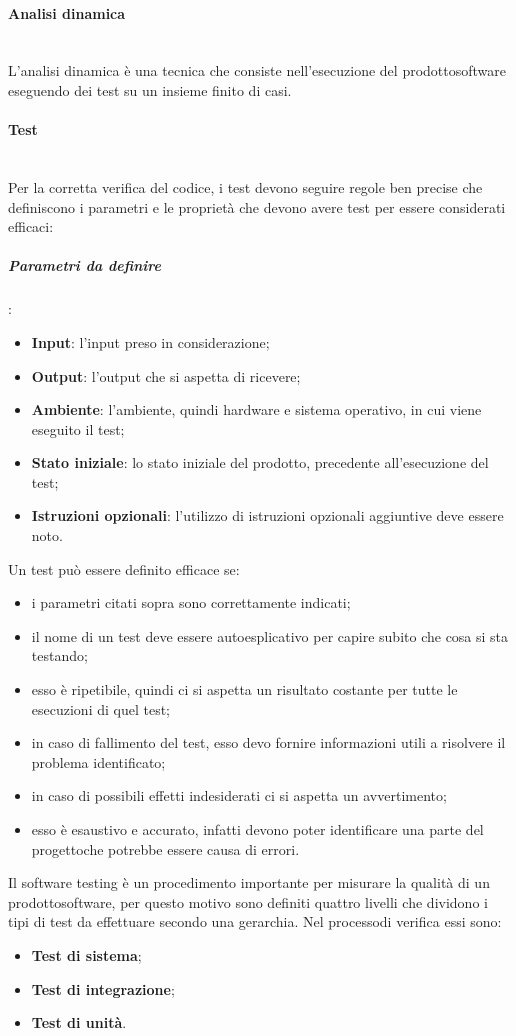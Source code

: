 \paragraph{Analisi dinamica} \mbox{}\\ [1mm]
L'analisi dinamica è una tecnica che consiste nell'esecuzione del prodotto\glosp software eseguendo dei test su un insieme finito di casi.
\paragraph*{Test}\mbox{}\\ [1mm]
Per la corretta verifica del codice, i test devono seguire regole ben precise che definiscono i parametri e le proprietà che devono avere test per essere considerati efficaci: \mbox{}\\ [1mm]
\subparagraph*{Parametri da definire}:
\begin{itemize}
	\item \textbf{Input}: l'input preso in considerazione;
	\item \textbf{Output}: l'output che si aspetta di ricevere;
	\item \textbf{Ambiente}: l'ambiente, quindi hardware e sistema operativo, in cui viene eseguito il test;
	\item \textbf{Stato iniziale}: lo stato iniziale del prodotto\glo, precedente all'esecuzione del test;
	\item \textbf{Istruzioni opzionali}: l'utilizzo di istruzioni opzionali aggiuntive deve essere noto.
\end{itemize} 
Un test può essere definito efficace se:
\begin{itemize}
	\item i parametri citati sopra sono correttamente indicati;
	\item il nome di un test deve essere autoesplicativo per capire subito che cosa si sta testando;
	\item esso è ripetibile, quindi ci si aspetta un risultato costante per tutte le esecuzioni di quel test;
	\item in caso di fallimento del test, esso devo fornire informazioni utili a risolvere il problema identificato;
	\item in caso di possibili effetti indesiderati ci si aspetta un avvertimento;
	\item esso è esaustivo e accurato, infatti devono poter identificare una parte del progetto\glosp che potrebbe essere causa di errori.
\end{itemize}
Il software testing è un procedimento importante per misurare la qualità di un prodotto\glosp software, per questo motivo sono definiti quattro livelli che dividono i tipi di test da effettuare secondo una gerarchia. Nel processo\glosp di verifica essi sono: 
\begin{itemize}
	\item \textbf{Test di sistema};
	\item \textbf{Test di integrazione};
	\item \textbf{Test di unità}.
\end{itemize}
